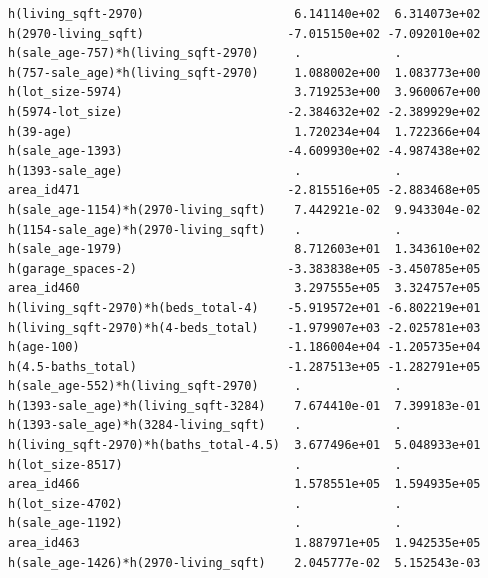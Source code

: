 \documentclass[
]{article}
\begin{document}
\begin{verbatim}
h(living_sqft-2970)                     6.141140e+02  6.314073e+02
h(2970-living_sqft)                    -7.015150e+02 -7.092010e+02
h(sale_age-757)*h(living_sqft-2970)     .             .           
h(757-sale_age)*h(living_sqft-2970)     1.088002e+00  1.083773e+00
h(lot_size-5974)                        3.719253e+00  3.960067e+00
h(5974-lot_size)                       -2.384632e+02 -2.389929e+02
h(39-age)                               1.720234e+04  1.722366e+04
h(sale_age-1393)                       -4.609930e+02 -4.987438e+02
h(1393-sale_age)                        .             .           
area_id471                             -2.815516e+05 -2.883468e+05
h(sale_age-1154)*h(2970-living_sqft)    7.442921e-02  9.943304e-02
h(1154-sale_age)*h(2970-living_sqft)    .             .           
h(sale_age-1979)                        8.712603e+01  1.343610e+02
h(garage_spaces-2)                     -3.383838e+05 -3.450785e+05
area_id460                              3.297555e+05  3.324757e+05
h(living_sqft-2970)*h(beds_total-4)    -5.919572e+01 -6.802219e+01
h(living_sqft-2970)*h(4-beds_total)    -1.979907e+03 -2.025781e+03
h(age-100)                             -1.186004e+04 -1.205735e+04
h(4.5-baths_total)                     -1.287513e+05 -1.282791e+05
h(sale_age-552)*h(living_sqft-2970)     .             .           
h(1393-sale_age)*h(living_sqft-3284)    7.674410e-01  7.399183e-01
h(1393-sale_age)*h(3284-living_sqft)    .             .           
h(living_sqft-2970)*h(baths_total-4.5)  3.677496e+01  5.048933e+01
h(lot_size-8517)                        .             .           
area_id466                              1.578551e+05  1.594935e+05
h(lot_size-4702)                        .             .           
h(sale_age-1192)                        .             .           
area_id463                              1.887971e+05  1.942535e+05
h(sale_age-1426)*h(2970-living_sqft)    2.045777e-02  5.152543e-03
                                                                  

\end{verbatim}
\end{document}
